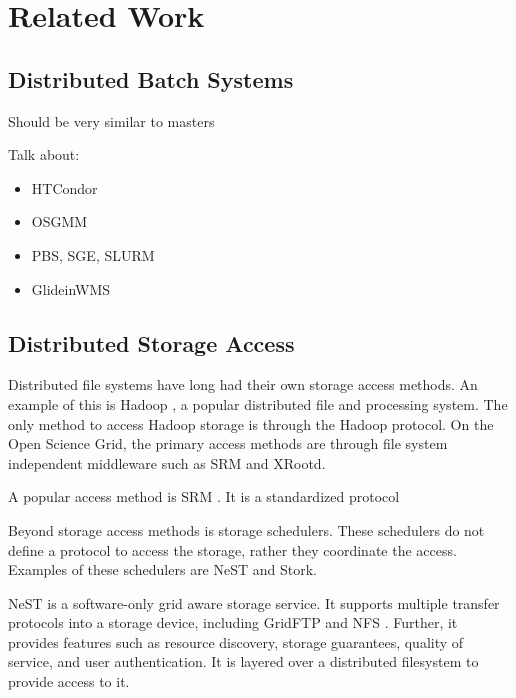 \chapter{Related Work}

\section{Distributed Batch Systems}

Should be very similar to masters

Talk about:
\begin{itemize}
\item HTCondor
\item OSGMM
\item PBS, SGE, SLURM
\item GlideinWMS
\end{itemize}

\section{Distributed Storage Access}

Distributed file systems have long had their own storage access methods.  An example of this is Hadoop \cite{white2012hadoop}, a popular distributed file and processing system.  The only method to access Hadoop storage is through the Hadoop protocol.  On the Open Science Grid, the primary access methods are through file system independent middleware such as SRM and XRootd. 


A popular access method is SRM \cite{shoshani2002storage}.  It is a standardized protocol 

Beyond storage access methods is storage schedulers.  These schedulers do not define a protocol to access the storage, rather they coordinate the access.  Examples of these schedulers are NeST and Stork.

NeST \cite{bent2002flexibility} is a software-only grid aware storage service.  It supports multiple transfer protocols into a storage device, including GridFTP \cite{allcock2005globus} and NFS \cite{walsh1985overview}.  Further, it provides features such as resource discovery, storage guarantees, quality of service, and user authentication.  It is layered over a distributed filesystem to provide access to it.

